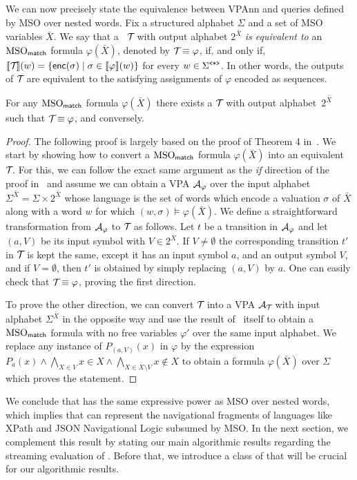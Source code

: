 We can now precisely state the equivalence between VPAnn and queries defined by MSO over nested words. Fix a structured alphabet $\Sigma$ and a set of MSO variables $\bar{X}$. We say that a \vpann~$\mathcal{T}\!$ with output alphabet $2^{\bar{X}}$ \emph{is equivalent to} an $\text{MSO}_{\textsf{match}}$ formula $\varphi(\bar{X})$, denoted by $\mathcal{T}\! \equiv \varphi$, if, and only if, $
{\llbracket{\mathcal{T}\!}\rrbracket}(w) = \{\textsf{enc}(\sigma)\mid \sigma\in{\llbracket{\varphi}\rrbracket}(w)\}
$ 
for every $w\in \Sigma^{\texttt{<*>}}$. In other words, the outputs of $\mathcal{T}\!$ are equivalent to the satisfying assignments of $\varphi$ encoded as sequences. 
\begin{proposition}
	For any $\text{MSO}_{\textsf{match}}$ formula $\varphi(\bar{X})$ there exists a \vpann $\mathcal{T}\!$ with output alphabet~$2^{\bar{X}}$ such that $\mathcal{T}\! \equiv \varphi$, and conversely. 
\end{proposition}
\begin{proof}
	The following proof is largely based on the proof of Theorem 4 in~\cite{AlurM04}.
	We start by showing how to convert a $\text{MSO}_{\textsf{match}}$ formula $\varphi(\bar{X})$ into an equivalent \vpann $\mathcal{T}\!$. For this, we can follow the exact same argument as the {\em if} direction of the proof in~\cite{AlurM04} and assume we can obtain a VPA $\mathcal{A}_\varphi$ over the input alphabet $\Sigma^{\bar{X}} = \Sigma \times 2^{\bar{X}}$ whose language is the set of words which encode a valuation $\sigma$ of $\bar{X}$ along with a word $w$ for which $(w, \sigma)\models\varphi(\bar{X})$. 
	We define a straightforward transformation from $\mathcal{A}_\varphi$ to $\mathcal{T}\!$ as follows. Let $t$ be a transition in $\mathcal{A}_\varphi$ and let $(a, V)$ be its input symbol with $V \in 2^{\bar{X}}$. If $V\neq\emptyset$ the corresponding transition $t'$ in $\mathcal{T}\!$ is kept the same, except it has an input symbol $a$, and an output symbol $V$, and if $V = \emptyset$, then $t'$ is obtained by simply replacing $(a, V)$ by $a$.
	One can easily check that $\mathcal{T}\! \equiv \varphi$, proving the first direction.
	
	To prove the other direction, we can convert $\mathcal{T}\!$ into a VPA $\mathcal{A}_\mathcal{T}\!$ with input alphabet $\Sigma^{\bar{X}}$ in the opposite way and use the result of~\cite{AlurM04} itself to obtain a $\text{MSO}_{\textsf{match}}$ formula with no free variables $\varphi'$ over the same input alphabet. We replace any instance of $P_{(a, V)}(x)$ in $\varphi$ by the expression $P_a(x) \wedge \bigwedge_{X\in V}x\in X\wedge \bigwedge_{X\in\bar{X}\setminus V}x\not\in X$ to obtain a formula $\varphi(\bar{X})$ over $\Sigma$ which proves the statement.
\end{proof}

We conclude that \vpann has the same expressive power as MSO over nested words, which implies that \vpann can represent the navigational fragments of languages like XPath and JSON Navigational Logic subsumed by MSO. In the next section, we complement this result by stating our main algorithmic results regarding the streaming evaluation of \vpann. Before that, we introduce a class of \vpannnames{} that will be crucial for our algorithmic results.

